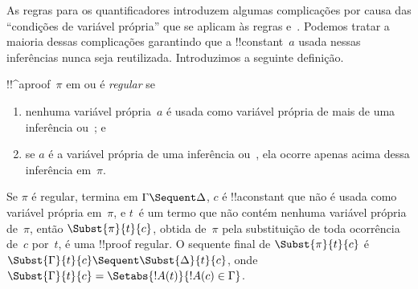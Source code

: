 \documentclass[../../../include/open-logic-section]{subfiles}
\begin{document}


As regras para os quantificadores introduzem algumas complicações por
causa das ``condições de variável própria'' que se aplicam às regras
\LeftR{\lexists} e~\RightR{\lforall}. Podemos tratar a maioria dessas
complicações garantindo que a !!{constant}~$a$ usada nessas inferências
nunca seja reutilizada. Introduzimos a seguinte definição.

\begin{defn}
!!^a{proof}~$\pi$ em  ou  é \emph{regular} se
\begin{enumerate}
  \item nenhuma variável própria~$a$ é usada como variável própria de
  mais de uma inferência \LeftR{\lexists} ou~\RightR{\lforall}; e
  \item se $a$ é a variável própria de uma inferência \LeftR{\lexists}
  ou~\RightR{\lforall}, ela ocorre apenas acima dessa inferência
  em~$\pi$.
\end{enumerate}
\end{defn}

\begin{lem} Se $\pi$ é regular, termina em
$\Gamma \Sequent \Delta$, $c$ é !!a{constant} que não é usada como
variável própria em~$\pi$, e $t$~é um termo que não contém nenhuma
variável própria de~$\pi$, então $\Subst{\pi}{t}{c}$, obtida de~$\pi$
pela substituição de toda ocorrência de~$c$ por~$t$, é uma !!{proof}
regular. O sequente final de $\Subst{\pi}{t}{c}$ é
$\Subst{\Gamma}{t}{c} \Sequent \Subst{\Delta}{t}{c}$, onde
$\Subst{\Gamma}{t}{c} = \Setabs{!A(t)}{!A(c) \in \Gamma}$.
\end{lem}
\end{document}
